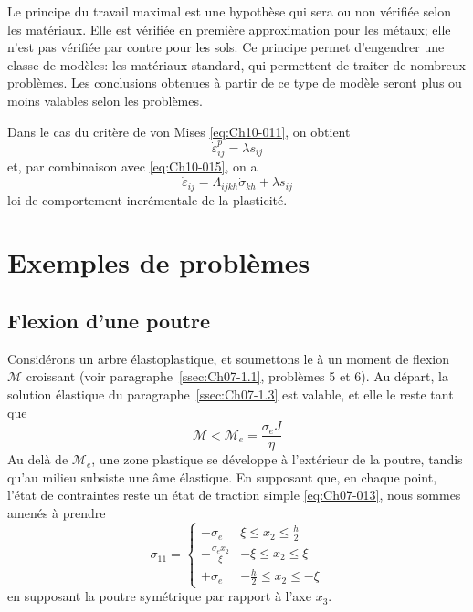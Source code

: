Le principe du travail maximal est une hypothèse qui sera ou non vérifiée selon les matériaux.
Elle est vérifiée en première approximation pour les métaux; elle n'est pas vérifiée par contre pour les sols.
Ce principe permet d'engendrer une classe de modèles: les matériaux standard, qui permettent de traiter de nombreux problèmes.
Les conclusions obtenues à partir de ce type de modèle seront plus ou moins valables selon les problèmes.

Dans le cas du critère de von Mises \eqref{eq:Ch10-011}, on obtient 
\begin{equation}
    \dot{\varepsilon}_{ij}^p = \lambda s_{ij}
    \label{eq:Ch10-025}
\end{equation}
et, par combinaison avec \eqref{eq:Ch10-015}, on a 
\begin{equation}
    \dot{\varepsilon}_{ij} = \Lambda_{ijkh} \dot{\sigma}_{kh} + \lambda s_{ij}
    \label{eq:Ch10-026}
\end{equation}
loi de comportement incrémentale de la plasticité. 

\section{Exemples de problèmes} \label{sec:Ch10-2}
\subsection{Flexion d'une poutre} \label{ssec:Ch10-2.1}
Considérons un arbre élastoplastique, et soumettons le à un moment 
de flexion $\mathcal{M}$ croissant (voir paragraphe~\ref{ssec:Ch07-1.1}, problèmes 5 et 6).
Au départ, la solution élastique du paragraphe~\ref{ssec:Ch07-1.3} est valable, et elle le reste tant que 
\begin{equation}
    \mathcal{M} < \mathcal{M}_e = \frac{\sigma_e J}{\eta}
    \label{eq:Ch10-027}
\end{equation}
Au delà de $\mathcal{M}_e$, une zone plastique se développe à l'extérieur de la poutre, tandis qu'au milieu subsiste une âme élastique.
En supposant que, en chaque point, l'état de contraintes reste un état de traction simple \eqref{eq:Ch07-013}, nous sommes amenés à prendre 
\begin{equation}
    \sigma_{11} = 
    \begin{cases}
        \displaystyle -\sigma_e & \displaystyle \xi \leq x_2 \leq  \frac{h}{2} \\
        \displaystyle -\frac{\sigma_e x_2}{\xi} & \displaystyle -\xi \leq x_2 \leq \xi \\
        \displaystyle +\sigma_e & \displaystyle -\frac{h}{2} \leq x_2 \leq -\xi
    \end{cases}
    \label{eq:Ch10-028}
\end{equation}
en supposant la poutre symétrique par rapport à l'axe $x_3$.

